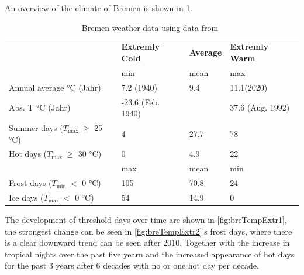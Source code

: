 \documentclass[12pt,a4paper, english,twoside]{scrartcl}
\begin{document}
      An overview of the climate of Bremen is shown in \cref{tab:statsBremen}.
      \begin{table}[ht]
        \centering
        \caption{Bremen weather data using data from~\cite{DWD2024a}\label{tab:statsBremen}}
        \renewcommand{\arraystretch}{1.4}
        \begin{tabular}{p{3.4cm}p{2.5cm}lp{2.5cm}}
          \toprule
          & \textbf{Extremly Cold} & \textbf{Average} & \textbf{Extremly Warm} \\
          & min & mean & max \\
          \midrule
          Annual average °C \newline (Jahr)     &   7.2 \newline(1940)       & 9.4    & 11.1\newline (2020)      \\
          Abs. T °C \newline (Jahr)             & -23.6 \newline(Feb. 1940)  &        & 37.6 \newline(Aug. 1992) \\
          Summer days \newline($T_{\max}~\ge$  25 °C) & 4                    & 27.7   & 78 \\
          Hot days \newline($T_{\max}~\ge$  30 °C)    & 0                    & 4.9    & 22 \\
          \midrule
          & max & mean & min \\
          \midrule
          Frost days \newline($T_{\min}~<$  0 °C)     & 105         & 70.8   & 24 \\
          Ice days \newline($T_{\max}~<$  0 °C)       & 54          & 14.9   & 0  \\
          \bottomrule
        \end{tabular}
      \end{table}
      The development of threshold days over time are shown in \cref{fig:breTempExtr1}, the strongest change can be seen in \cref{fig:breTempExtr2}'s frost days, where there is a clear downward trend can be seen after 2010. 
      Together with the increase in tropical nights over the past five yearn and the increased appearance of hot days for the past 3 years after 6 decades with no or one hot day per decade.
\end{document}
